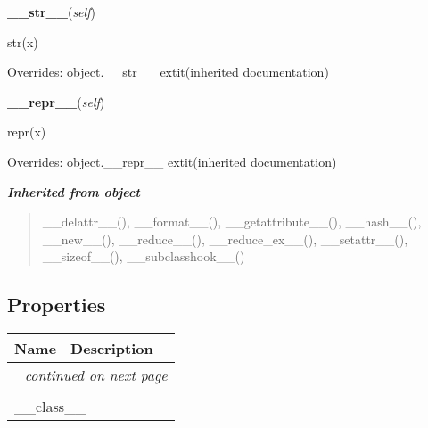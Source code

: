     \vspace{0.5ex}

\hspace{.8\funcindent}\begin{boxedminipage}{\funcwidth}

    \raggedright \textbf{\_\_str\_\_}(\textit{self})

\setlength{\parskip}{2ex}
    str(x)

\setlength{\parskip}{1ex}
      Overrides: object.\_\_str\_\_ 	extit{(inherited documentation)}

    \end{boxedminipage}

    \vspace{0.5ex}

\hspace{.8\funcindent}\begin{boxedminipage}{\funcwidth}

    \raggedright \textbf{\_\_repr\_\_}(\textit{self})

\setlength{\parskip}{2ex}
    repr(x)

\setlength{\parskip}{1ex}
      Overrides: object.\_\_repr\_\_ 	extit{(inherited documentation)}

    \end{boxedminipage}


\large{\textbf{\textit{Inherited from object}}}

\begin{quote}
\_\_delattr\_\_(), \_\_format\_\_(), \_\_getattribute\_\_(), \_\_hash\_\_(), \_\_new\_\_(), \_\_reduce\_\_(), \_\_reduce\_ex\_\_(), \_\_setattr\_\_(), \_\_sizeof\_\_(), \_\_subclasshook\_\_()
\end{quote}


  \subsection{Properties}

    \vspace{-1cm}
\hspace{\varindent}\begin{longtable}{|p{\varnamewidth}|p{\vardescrwidth}|l}
\cline{1-2}
\cline{1-2} \centering \textbf{Name} & \centering \textbf{Description}& \\
\cline{1-2}
\endhead\cline{1-2}\multicolumn{3}{r}{\small\textit{continued on next page}}\\\endfoot\cline{1-2}
\endlastfoot\multicolumn{2}{|l|}{\textit{Inherited from object}}\\
\multicolumn{2}{|p{\varwidth}|}{\raggedright \_\_class\_\_}\\
\cline{1-2}
\end{longtable}

